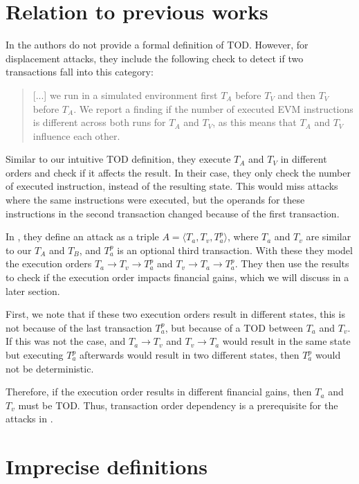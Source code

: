 \documentclass[draft,final]{vutinfth} %
\begin{document}
\section{Relation to previous works}

In \cite{torres_frontrunner_2021} the authors do not provide a formal definition of TOD. However, for displacement attacks, they include the following check to detect if two transactions fall into this category:

\begin{quote}
    [...] we run in a simulated environment first $T_A$ before $T_V$ and then $T_V$ before $T_A$. We report a finding if the number of executed EVM instructions is different across both runs for $T_A$ and $T_V$, as this means that $T_A$ and $T_V$ influence each other.
\end{quote}

Similar to our intuitive TOD definition, they execute $T_A$ and $T_V$ in different orders and check if it affects the result. In their case, they only check the number of executed instruction, instead of the resulting state. This would miss attacks where the same instructions were executed, but the operands for these instructions in the second transaction changed because of the first transaction.

In \cite{zhang_combatting_2023}, they define an attack as a triple $A = \langle T_a, T_v, T_a^p\rangle$, where $T_a$ and $T_v$ are similar to our $T_A$ and $T_B$, and $T_a^p$ is an optional third transaction. With these they model the execution orders $T_a \rightarrow T_v \rightarrow T_a^p$ and $T_v \rightarrow T_a \rightarrow T_a^p$. They then use the results to check if the execution order impacts financial gains, which we will discuss in a later section.

First, we note that if these two execution orders result in different states, this is not because of the last transaction $T_a^p$, but because of a TOD between $T_a$ and $T_v$. If this was not the case, and $T_a \rightarrow T_v$ and $T_v \rightarrow T_a$ would result in the same state but executing $T_a^p$ afterwards would result in two different states, then $T_a^p$ would not be deterministic.

Therefore, if the execution order results in different financial gains, then $T_a$ and $T_v$ must be TOD. Thus, transaction order dependency is a prerequisite for the attacks in \cite{zhang_combatting_2023}.

\section{Imprecise definitions}
\end{document}
